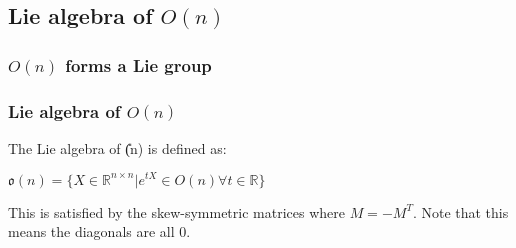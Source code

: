 
\subsection{Lie algebra of \(O(n)\)}

\subsubsection{\(O(n)\) forms a Lie group}

\subsubsection{Lie algebra of \(O(n)\)}

The Lie algebra of \U(n)\) is defined as:

\(\mathfrak{o}(n)=\{X\in \mathbb {R}^{n\times n}|e^{tX}\in O(n) \forall t\in \mathbb{R}\}\)

This is satisfied by the skew-symmetric matrices where \(M=-M^T\). Note that this means the diagonals are all \(0\).


